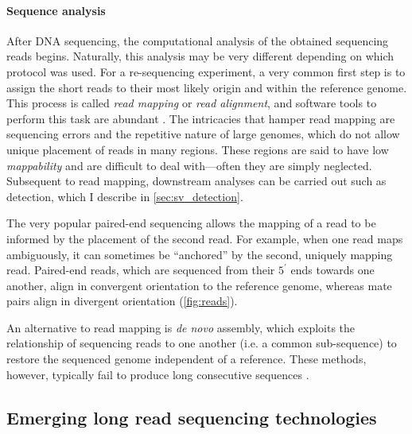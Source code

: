 \paragraph{Sequence analysis}
After DNA sequencing, the computational analysis of the obtained sequencing
reads begins. Naturally, this analysis may be very different depending on which
protocol was used. For a \wgs re-sequencing experiment, a very common first step
is to assign the short reads to their most likely origin and
 within the reference
genome. This process is called \emph{read mapping} or \emph{read alignment}, and
software tools to perform this task are abundant
\citep{Li2009,Weese2009,Langmead2009,Alkan2009,Li2013}. The intricacies that
hamper read mapping are sequencing errors and the repetitive nature of large
genomes, which do not allow unique placement of reads in many regions. These
regions are said to have low \emph{mappability} and are difficult to deal with---often they are simply neglected.
Subsequent to read mapping, downstream analyses can be carried out such as \sv
detection, which I describe in \cref{sec:sv_detection}.

The very popular paired-end sequencing allows the mapping of a read to be
informed by the placement of the second read. For example, when one read maps
ambiguously, it can sometimes be ``anchored'' by the second, uniquely mapping read.
Paired-end reads, which are sequenced from their $5^\prime$ ends towards one
another, align in convergent orientation to the reference genome, whereas mate
pairs align in divergent orientation (\cref{fig:reads}).

An alternative to read mapping is \emph{de novo} assembly, which exploits the
relationship of sequencing reads to one another (i.e. a common sub-sequence) to
restore the sequenced genome independent of a reference. These methods, however,
typically fail to produce long consecutive sequences \citep{Alkan2011_assembly}.










\subsection{Emerging long read sequencing technologies}
\label{sec:long_read_seq}

